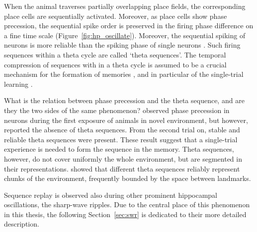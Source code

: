     When the animal traverses partially overlapping place fields, the
    corresponding place cells are sequentially activated. Moreover, as place
    cells show phase precession, the sequential spike order is preserved in the
    firing phase difference on a fine time scale (Figure~\ref{fig:hp_oscillate}).
    Moreover, the sequential spiking of neurons is more reliable than the
    spiking phase of single neurons \citep{Dragoi2006}. Such firing sequences
    within a theta cycle are called `theta sequences'. The temporal compression
    of sequences with in a theta cycle is assumed to be a crucial mechanism for
    the formation of memories \cite{Skaggs1996}, and in particular of the
    single-trial learning \citep{Rutishauser2006}. 
    
    What is the relation between phase precession and the theta sequence, and
    are they the two sides of the same phenomenon? \cite{Feng2015} observed
    phase precession in neurons during the first exposure of animals in novel
    environment, but however, reported the absence of theta sequences. From the
    second trial on, stable and reliable theta sequences were present. These
    result suggest that a single-trial experience is needed to form the
    sequence in the memory. Theta sequences, however, do not cover uniformly
    the whole environment, but are segmented in their representations.
    \cite{Gupta2012} showed that different theta sequences reliably represent
    chunks of the environment, frequently bounded by the space between
    landmarks.

    Sequence replay is observed also during other prominent hippocampal
    oscillations, the sharp-wave ripples. Due to the central place of this
    phenomenon in this thesis, the following Section~\ref{sec:swr} is dedicated
    to their more detailed description.

